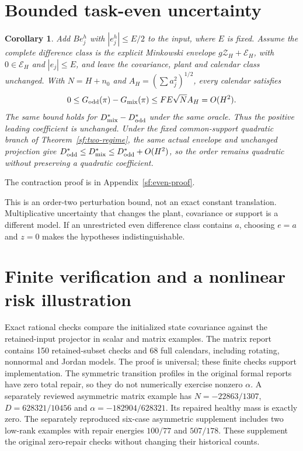 \documentclass[journal]{IEEEtran}
\newtheorem{corollary}{Corollary}
\begin{document}
\section{Bounded task-even uncertainty}\label{sf:even-section}
\begin{corollary}\label{sf:even}
Add $Be_j^h$ with $|e_j^h|\le E/2$ to the input, where $E$ is fixed.
Assume the complete difference class is the explicit Minkowski envelope
$g\mathcal Z_H+\mathcal E_H$, with $0\in\mathcal E_H$ and
$|e_j|\le E$, and leave the covariance, plant and calendar class unchanged.
With $N=H+n_0$ and $A_H=(\sum a_j^2)^{1/2}$, every calendar satisfies
\[
0\le G_{\rm odd}(\pi)-G_{\rm mix}(\pi)
\le FE\sqrt N A_H=O(H^2).
\]
The same bound holds for $D_{\rm mix}^*-D_{\rm odd}^*$ under the same oracle.
Thus the positive leading coefficient is unchanged. Under the fixed
common-support quadratic branch of Theorem~\ref{sf:two-regime}, the same
actual envelope and unchanged projection give
$D_{\rm odd}^*\le D_{\rm mix}^*\le D_{\rm odd}^*+O(H^2)$,
so the order remains quadratic without preserving a quadratic coefficient.
\end{corollary}
The contraction proof is in Appendix~\ref{sf:even-proof}.

This is an order-two perturbation bound, not an exact constant translation.
Multiplicative uncertainty that changes the plant, covariance or support is a
different model. If an unrestricted even difference class contains $a$,
choosing $e=a$ and $z=0$ makes the hypotheses indistinguishable.

\section{Finite verification and a nonlinear risk illustration}\label{sf:verification}
Exact rational checks compare the initialized state covariance against the
retained-input projector in scalar and matrix examples. The matrix report
contains 150 retained-subset checks and 68 full calendars, including rotating,
nonnormal and Jordan models. The proof is universal; these finite checks
support implementation. The symmetric transition profiles in the original
formal reports have zero total repair, so they do not numerically exercise
nonzero $\alpha$. A separately reviewed asymmetric matrix example has
$N=-22863/1307$, $D=628321/10456$ and $\alpha=-182904/628321$.
Its repaired healthy mass is exactly zero. The separately reproduced
six-case asymmetric supplement includes two low-rank examples with repair
energies $100/77$ and $507/178$. These supplement the original zero-repair
checks without changing their historical counts.
\end{document}
